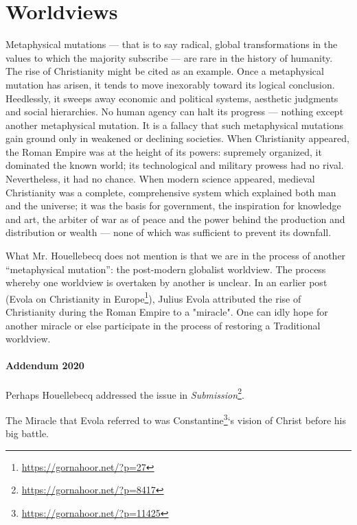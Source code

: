 \section{Worldviews}

\begin{quotex}
Metaphysical mutations --- that is to say radical, global transformations in the values to which the majority subscribe --- are rare in the history of humanity. The rise of Christianity might be cited as an example. Once a metaphysical mutation has arisen, it tends to move inexorably toward its logical conclusion. Heedlessly, it sweeps away economic and political systems, aesthetic judgments and social hierarchies. No human agency can halt its progress --- nothing except another metaphysical mutation. It is a fallacy that such metaphysical mutations gain ground only in weakened or declining societies. When Christianity appeared, the Roman Empire was at the height of its powers: supremely organized, it dominated the known world; its technological and military prowess had no rival. Nevertheless, it had no chance. When modern science appeared, medieval Christianity was a complete, comprehensive system which explained both man and the universe; it was the basis for government, the inspiration for knowledge and art, the arbiter of war as of peace and the power behind the production and distribution or wealth --- none of which was sufficient to prevent its downfall.
\end{quotex}


What Mr. Houellebecq does not mention is that we are in the process of another ``metaphysical mutation'': the post-modern globalist worldview. The process whereby one worldview is overtaken by another is unclear. In an earlier post (Evola on Christianity in Europe\footnote{\url{https://gornahoor.net/?p=27}}), Julius Evola attributed the rise of Christianity during the Roman Empire to a "miracle". One can idly hope for another miracle or else participate in the process of restoring a Traditional worldview.

\paragraph{Addendum 2020}


Perhaps Houellebecq addressed the issue in \textit{Submission}\footnote{\url{https://gornahoor.net/?p=8417}}.

The Miracle that Evola referred to was Constantine\footnote{\url{https://gornahoor.net/?p=11425}}`s vision of Christ before his big battle.

